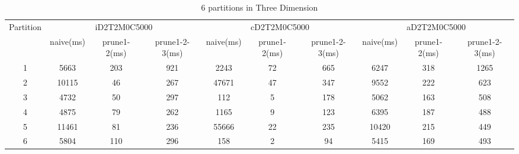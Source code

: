 \begin{table*}[t]
  \centering
\makeatletter
    \long{}
\makeatother
  \caption{6 partitions in Three Dimension}
    \vspace*{3pt}
  \footnotesize

  \label{table:partition6inThree}
  \begin{tabular}{|c||c|c|c|c|c|c|c|c|c|}
  \hline
  \multirow{2}{*}{Partition} &  \multicolumn{3}{|c|}{iD2T2M0C5000} & \multicolumn{3}{|c|}{cD2T2M0C5000} &\multicolumn{3}{|c|}{aD2T2M0C5000} \\\cline{2-10}
    &  naive(ms) & prune1-2(ms) & prune1-2-3(ms) & naive(ms) & prune1-2(ms) & prune1-2-3(ms) & naive(ms) & prune1-2(ms) & prune1-2-3(ms) \\\hline \hline

\cline{2-10}
    1 &  5663 & 203 & 921 & 2243 & 72 & 665 & 6247  & 318 & 1265 \\\hline

\cline{2-10}
    2 &  10115 & 46 & 267 & 47671 & 47 & 347 & 9552 & 222 & 623 \\\hline

\cline{2-10}
    3 &  4732 & 50 & 297 & 112 & 5 & 178 & 5062 & 163 & 508 \\\hline
    
\cline{2-10}
    4 &  4875 & 79 & 262 & 1165 & 9 & 123 & 6395 & 187 & 488 \\\hline
    
\cline{2-10}
    5 &  11461 & 81 & 236 & 55666 & 22 & 235 & 10420 & 215 & 449 \\\hline
    
\cline{2-10}
    6 &  5804 & 110 & 296 & 158 & 2 & 94 & 5415 & 169 & 493 \\\hline

  \end{tabular}
  \vspace*{-17pt}
\end{table*}


